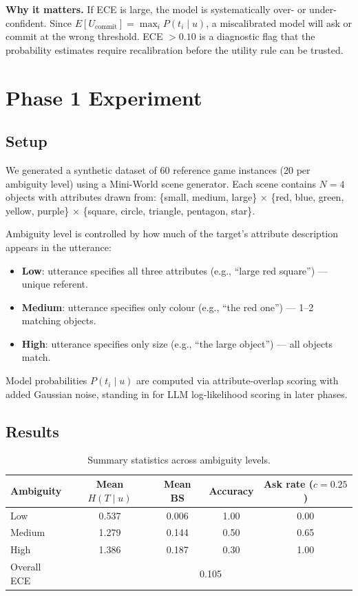\documentclass[11pt]{article}
\begin{document}
\textbf{Why it matters.}
If ECE is large, the model is systematically over- or under-confident.  Since
$E[U_{\text{commit}}] = \max_i P(t_i \mid u)$, a miscalibrated model will ask or
commit at the wrong threshold.  ECE $> 0.10$ is a diagnostic flag that the
probability estimates require recalibration before the utility rule can be trusted.

\section{Phase 1 Experiment}

\subsection{Setup}

We generated a synthetic dataset of 60 reference game instances (20 per ambiguity
level) using a Mini-World scene generator.  Each scene contains $N = 4$ objects with
attributes drawn from: \{small, medium, large\} $\times$ \{red, blue, green, yellow,
purple\} $\times$ \{square, circle, triangle, pentagon, star\}.

Ambiguity level is controlled by how much of the target's attribute description
appears in the utterance:
\begin{itemize}
    \item \textbf{Low}: utterance specifies all three attributes (e.g., ``large red square'') --- unique referent.
    \item \textbf{Medium}: utterance specifies only colour (e.g., ``the red one'') --- 1--2 matching objects.
    \item \textbf{High}: utterance specifies only size (e.g., ``the large object'') --- all objects match.
\end{itemize}

Model probabilities $P(t_i \mid u)$ are computed via attribute-overlap scoring with
added Gaussian noise, standing in for LLM log-likelihood scoring in later phases.

\subsection{Results}

\begin{table}[h]
\centering
\begin{tabular}{lcccc}
\toprule
Ambiguity & Mean $H(T \mid u)$ & Mean BS & Accuracy & Ask rate ($c{=}0.25$) \\
\midrule
Low    & 0.537 & 0.006 & 1.00 & 0.00 \\
Medium & 1.279 & 0.144 & 0.50 & 0.65 \\
High   & 1.386 & 0.187 & 0.30 & 1.00 \\
\midrule
Overall ECE & \multicolumn{4}{c}{0.105} \\
\bottomrule
\end{tabular}
\caption{Summary statistics across ambiguity levels.}
\label{tab:summary}
\end{table}
\end{document}
